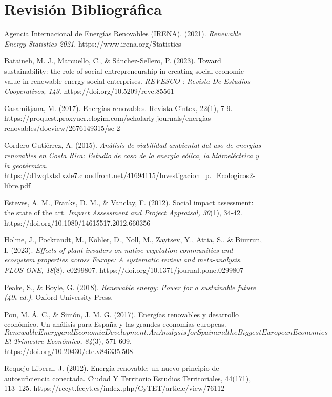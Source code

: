 \documentclass[
  letterpaper,
  DIV=11,
  numbers=noendperiod]{scrreprt}
\begin{document}
\section{Revisión Bibliográfica}\label{revisiuxf3n-bibliogruxe1fica}

Agencia Internacional de Energías Renovables (IRENA). (2021).
\emph{Renewable Energy Statistics 2021}.
https://www.irena.org/Statistics

Bataineh, M. J., Marcuello, C., \& Sánchez-Sellero, P. (2023). Toward
sustainability: the role of social entrepreneurship in creating
social-economic value in renewable energy social enterprises.
\emph{REVESCO : Revista De Estudios Cooperativos, 143}.
https://doi.org/10.5209/reve.85561

Casamitjana, M. (2017). Energías renovables. Revista Cintex, 22(1), 7-9.
https://proquest.proxyucr.elogim.com/scholarly-journals/energías-renovables/docview/2676149315/se-2

Cordero Gutiérrez, A. (2015). \emph{Análisis de viabilidad ambiental del
uso de energías renovables en Costa Rica: Estudio de caso de la energía
eólica, la hidroeléctrica y la geotérmica}.
https://d1wqtxts1xzle7.cloudfront.net/41694115/Investigacion\_p.\_Ecologicos2-libre.pdf

Esteves, A. M., Franks, D. M., \& Vanclay, F. (2012). Social impact
assessment: the state of the art. \emph{Impact Assessment and Project
Appraisal, 30}(1), 34-42. https://doi.org/10.1080/14615517.2012.660356

Holme, J., Pockrandt, M., Köhler, D., Noll, M., Zaytsev, Y., Attia, S.,
\& Biurrun, I. (2023). \emph{Effects of plant invaders on native
vegetation communities and ecosystem properties across Europe: A
systematic review and meta-analysis. PLOS ONE, 18}(8), e0299807.
https://doi.org/10.1371/journal.pone.0299807

Peake, S., \& Boyle, G. (2018). \emph{Renewable energy: Power for a
sustainable future (4th ed.)}. Oxford University Press.

Pou, M. Á. C., \& Simón, J. M. G. (2017). Energías renovables y
desarrollo económico. Un análisis para España y las grandes economías
europeas.
\[Renewable Energy and Economic Development. An Analysis for Spain and the Biggest European Economies\]
\emph{El Trimestre Económico, 84}(3), 571-609.
https://doi.org/10.20430/ete.v84i335.508

Requejo Liberal, J. (2012). Energía renovable: un nuevo principio de
autosuficiencia conectada. Ciudad Y Territorio Estudios Territoriales,
44(171), 113--125.
https://recyt.fecyt.es/index.php/CyTET/article/view/76112
\end{document}
